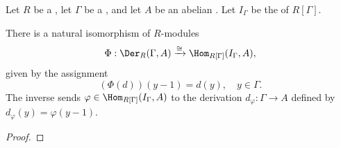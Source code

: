 \begin{theorem} \label{theorem:isomorphism_between_derivations_and_homs_from_augmentation_ideal}
    Let $R$ be a , let $\Gamma$ be a , and let $A$ be an abelian . Let $I_\Gamma$ be the  of $R[\Gamma]$.

    There is a natural isomorphism of $R$-modules
    $$\Phi: \Der_R(\Gamma, A) \xrightarrow{\cong} \Hom_{R[\Gamma]}(I_\Gamma, A),$$
    given by the assignment
    $$(\Phi(d))(y - 1) = d(y), \quad y \in \Gamma.$$
    The inverse sends $\varphi \in \Hom_{R[\Gamma]}(I_\Gamma, A)$ to the derivation $d_\varphi: \Gamma \to A$ defined by $d_\varphi(y) = \varphi(y - 1)$.
\end{theorem}
\begin{proof}
    \TODO{}


\end{proof}
